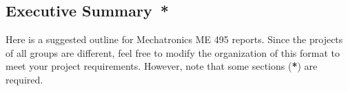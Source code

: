 \subsection*{Executive Summary{{\color{red}\ *}}}

Here is a suggested outline for Mechatronics ME 495 reports. Since the projects of all groups are different, feel free to modify the organization of this format to meet your project requirements. However, note that some sections ({\color{red}\bf{*}}) are required. 